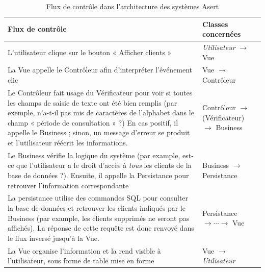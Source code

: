 \begin{table}[ht]
\begin{center}
    \begin{tabular}{ | p{8.5cm} | p{5cm} |}
    \hline
    \textbf{Flux de contrôle} & \textbf{Classes concernées} \\ \hline
    L'utilisateur clique sur le bouton « Afficher clients »  & \textit{Utilisateur} $\rightarrow$ Vue \\ \hline
    La Vue appelle le Contrôleur afin d'interpréter l'événement clic & Vue $\rightarrow$ Contrôleur \\ \hline
    Le Contrôleur fait usage du Vérificateur pour voir si toutes les champs de saisie de texte ont été bien remplis 
    	(par exemple, n'a-t-il pas mis de caractères de l'alphabet dans le champ « période de consultation » ?)
    	En cas positif, il appelle le Business ; sinon, un message d'erreur se produit et l'utilisateur réécrit les informations. 
    	& Contrôleur $\rightarrow$ (Vérificateur) $\rightarrow$ Business \\ \hline
    Le Business vérifie la logique du système (par example, est-ce que l'utilisateur a le droit d'accès à 
    \textit{tous} les clients de la base de données ?).
    	Ensuite, il appelle la Persistance pour retrouver l'information correspondante
    	& Business  $\rightarrow$ Persistance \\ \hline
    La persistance utilise des commandes SQL pour consulter la base de données et retrouver les clients indiqués par le Business 
    	(par example, les clients supprimés ne seront pas affichés). 
    	La réponse de cette requête est donc renvoyé dans le flux inversé jusqu'à la Vue. 
    	& Persistance $\rightarrow \cdots \rightarrow$ Vue \\ \hline
    La Vue organise l'information et la rend visible à l'utilisateur, sous forme de table mise en forme 
    	& Vue $\rightarrow$ \textit{Utilisateur} \\
    \hline
    \end{tabular}
\end{center}
\caption{Flux de contrôle dans l'architecture des systèmes Asert}\label{flux}
\end{table}